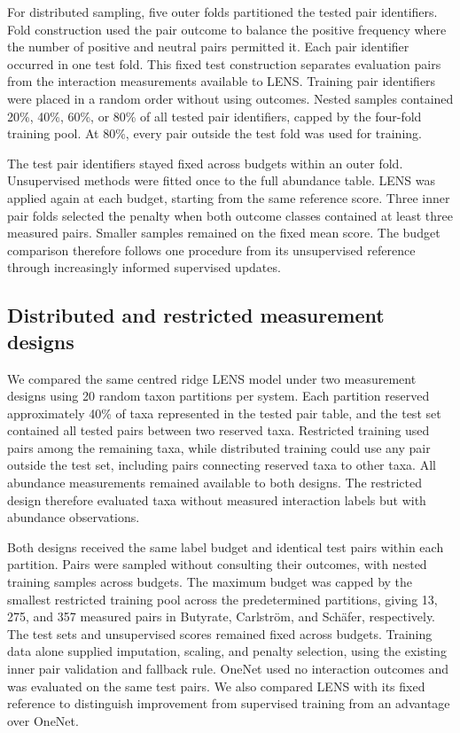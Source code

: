 \documentclass[11pt]{article}
\begin{document}
For distributed sampling, five outer folds partitioned the tested pair identifiers.
Fold construction used the pair outcome to balance the positive frequency where the number of positive and neutral pairs permitted it.
Each pair identifier occurred in one test fold.
This fixed test construction separates evaluation pairs from the interaction measurements available to LENS.
Training pair identifiers were placed in a random order without using outcomes.
Nested samples contained 20\%, 40\%, 60\%, or 80\% of all tested pair identifiers, capped by the four-fold training pool.
At 80\%, every pair outside the test fold was used for training.

The test pair identifiers stayed fixed across budgets within an outer fold.
Unsupervised methods were fitted once to the full abundance table.
LENS was applied again at each budget, starting from the same reference score.
Three inner pair folds selected the penalty when both outcome classes contained at least three measured pairs.
Smaller samples remained on the fixed mean score.
The budget comparison therefore follows one procedure from its unsupervised reference through increasingly informed supervised updates.

\subsection{Distributed and restricted measurement designs}
\label{sec:measurement-placement-methods}

We compared the same centred ridge LENS model under two measurement designs using 20 random taxon partitions per system.
Each partition reserved approximately 40\% of taxa represented in the tested pair table, and the test set contained all tested pairs between two reserved taxa.
Restricted training used pairs among the remaining taxa, while distributed training could use any pair outside the test set, including pairs connecting reserved taxa to other taxa.
All abundance measurements remained available to both designs.
The restricted design therefore evaluated taxa without measured interaction labels but with abundance observations.

Both designs received the same label budget and identical test pairs within each partition.
Pairs were sampled without consulting their outcomes, with nested training samples across budgets.
The maximum budget was capped by the smallest restricted training pool across the predetermined partitions, giving 13, 275, and 357 measured pairs in Butyrate, Carlstr\"om, and Sch\"afer, respectively.
The test sets and unsupervised scores remained fixed across budgets.
Training data alone supplied imputation, scaling, and penalty selection, using the existing inner pair validation and fallback rule.
OneNet used no interaction outcomes and was evaluated on the same test pairs.
We also compared LENS with its fixed reference to distinguish improvement from supervised training from an advantage over OneNet.
\end{document}
